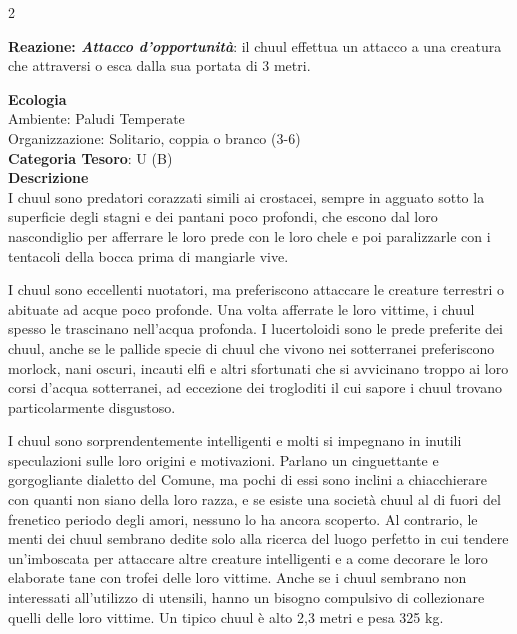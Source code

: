 \begin{multicols}{2}
{\textbf{Reazione: \emph{Attacco d'opportunità}}: il chuul effettua un attacco a una creatura che attraversi o esca dalla sua portata di 3 metri.

\textbf{Ecologia}\\
Ambiente: Paludi Temperate\\
Organizzazione: Solitario, coppia o branco (3-6)\\
\textbf{Categoria Tesoro}: U (B)\\
\textbf{Descrizione}\\
I chuul sono predatori corazzati simili ai crostacei, sempre in agguato sotto la superficie degli stagni e dei pantani poco profondi, che escono dal loro nascondiglio per afferrare le loro prede con le loro chele e poi paralizzarle con i tentacoli della bocca prima di mangiarle vive.

I chuul sono eccellenti nuotatori, ma preferiscono attaccare le creature terrestri o abituate ad acque poco profonde. Una volta afferrate le loro vittime, i chuul spesso le trascinano nell'acqua profonda. I lucertoloidi sono le prede preferite dei chuul, anche se le pallide specie di chuul che vivono nei sotterranei preferiscono morlock, nani oscuri, incauti elfi e altri sfortunati che si avvicinano troppo ai loro corsi d'acqua sotterranei, ad eccezione dei trogloditi il cui sapore i chuul trovano particolarmente disgustoso.

I chuul sono sorprendentemente intelligenti e molti si impegnano in inutili speculazioni sulle loro origini e motivazioni. Parlano un cinguettante e gorgogliante dialetto del Comune, ma pochi di essi sono inclini a chiacchierare con quanti non siano della loro razza, e se esiste una società chuul al di fuori del frenetico periodo degli amori, nessuno lo ha ancora scoperto. Al contrario, le menti dei chuul sembrano dedite solo alla ricerca del luogo perfetto in cui tendere un'imboscata per attaccare altre creature intelligenti e a come decorare le loro elaborate tane con trofei delle loro vittime. Anche se i chuul sembrano non interessati all'utilizzo di utensili, hanno un bisogno compulsivo di collezionare quelli delle loro vittime. Un tipico chuul è alto 2,3 metri e pesa 325 kg.

}
\end{multicols}
